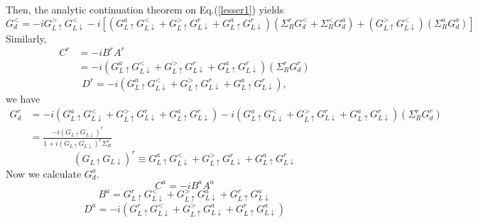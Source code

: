 \documentclass[aps,prb,superscriptaddress]{revtex4-2}
\begin{document}
Then, the analytic continuation theorem on Eq.(\ref{lesser1}) yields
\begin{equation}
G_{d}^{<}=-i G_{L \uparrow}^{>} G_{L \downarrow}^{<} -i\left[(G_{L \uparrow}^{a} G_{L \downarrow}^{<}+G_{L \uparrow}^{>} G_{L \downarrow}^{r}+G_{L \uparrow}^{a} G_{L \downarrow}^{r})(\Sigma_{R}^{r} G_{d}^{<}+\Sigma_{R}^{<} G_{d}^{a}) + (G_{L\uparrow}^{>} G_{L\downarrow}^{<})(\Sigma_{R}^{a} G_{d}^{a})\right]
\label{eq:Gd<}
\end{equation}
Similarly, 
\begin{equation}
\begin{split}
C^{r}&=-iB^{r} A^{r} \\
&=-i(G_{L \uparrow}^{a} G_{L \downarrow}^{<}+G_{L \uparrow}^{>} G_{L \downarrow}^{r}+G_{L \uparrow}^{a} G_{L \downarrow}^{r})(\Sigma_{R}^{r} G_{d}^{r})
\end{split}
\end{equation}
\begin{equation}
D^{r}=-i(G_{L \uparrow}^{a} G_{L \downarrow}^{<}+G_{L \uparrow}^{>} G_{L \downarrow}^{r}+G_{L \uparrow}^{a} G_{L \downarrow}^{r}),
\end{equation}
we have
\begin{equation}
\begin{split}
G_{d}^{r} &=  -i(G_{L \uparrow}^{a} G_{L \downarrow}^{<}+G_{L \uparrow}^{>} G_{L \downarrow}^{r}+G_{L \uparrow}^{a} G_{L \downarrow}^{r})-i(G_{L \uparrow}^{a} G_{L \downarrow}^{<}+G_{L \uparrow}^{>} G_{L \downarrow}^{r}+G_{L \uparrow}^{a} G_{L \downarrow}^{r})(\Sigma_{R}^{r} G_{d}^{r}) \\
&=\frac{-i\left(G_{L \uparrow} G_{L \downarrow}\right)^{r}}{ 1+i\left(G_{L \uparrow} G_{L \downarrow}\right)^{r} \Sigma_{R}^{r}}
\end{split}
\end{equation}
\begin{equation}
(G_{L \uparrow} G_{L \downarrow})^{r} \equiv G_{L \uparrow}^{a} G_{L \downarrow}^{<}+G_{L \uparrow}^{>} G_{L \downarrow}^{r}+G_{L \uparrow}^{a} G_{L \downarrow}^{r}
\end{equation}
Now we calculate $G_{d}^{a}$.
\begin{equation}
C^{a}=-iB^{a} A^{a}
\end{equation}
\begin{equation}
B^{a}=G_{L \uparrow}^{r} G_{L \downarrow}^{<}+G_{L \uparrow}^{>} G_{L \downarrow}^{a}+G_{L \uparrow}^{r} G_{L \downarrow}^{a}
\end{equation}
\begin{equation}
D^{a}=-i(G_{L \uparrow}^{r} G_{L \downarrow}^{<}+G_{L \uparrow}^{>} G_{L \downarrow}^{a}+G_{L \uparrow}^{r} G_{L \downarrow}^{a})
\end{equation}
\end{document}

